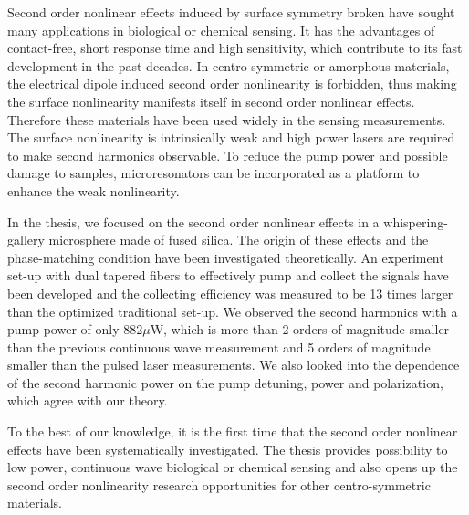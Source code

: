 \begin{eabstract}
Second order nonlinear effects induced by surface symmetry broken have sought many applications in biological or chemical sensing. It has the advantages of contact-free, short response time and high sensitivity, which contribute to its fast development in the past decades. In centro-symmetric or amorphous materials, the electrical dipole induced second order nonlinearity is forbidden, thus making the surface nonlinearity manifests itself in second order nonlinear effects. Therefore these materials have been used widely in the sensing measurements. The surface nonlinearity is intrinsically weak and high power lasers are required to make second harmonics observable. To reduce the pump power and possible damage to samples, microresonators can be incorporated as a platform to enhance the weak nonlinearity.

In the thesis, we focused on the second order nonlinear effects in a whispering-gallery microsphere made of fused silica. The origin of these effects and the phase-matching condition have been investigated theoretically. An experiment set-up with dual tapered fibers to effectively pump and collect the signals have been developed and the collecting efficiency was measured to be 13 times larger than the optimized traditional set-up. We observed the second harmonics with a pump power of only 882$\mu$W, which is more than 2 orders of magnitude smaller than the previous continuous wave measurement and 5 orders of magnitude smaller than the pulsed laser measurements. We also looked into the dependence of the second harmonic power on the pump detuning, power and polarization, which agree with our theory.

To the best of our knowledge, it is the first time that the second order nonlinear effects have been systematically investigated. The thesis provides possibility to low power, continuous wave biological or chemical sensing and also opens up the second order nonlinearity research opportunities for other centro-symmetric materials.
\end{eabstract}

